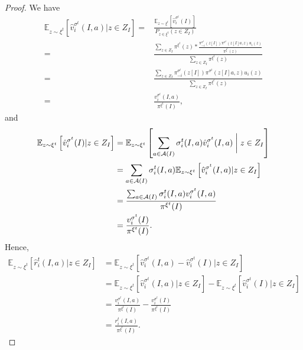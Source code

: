 \documentclass[letterpaper]{article} %
\makeatletter
\renewenvironment{align*}{%
  \linenomath 
  \start@align\@ne\st@rredtrue\m@ne
}{%
  \endalign
  \endlinenomath 
}
\makeatother
\begin{document}
\begin{proof}

We have
\begin{align*}
    \mathbb{E}_{z \sim \xi^t}\left[ \hat{v}_i^{\sigma^t}(I, a) \vert z \in Z_I\right] =& \frac{\mathbb{E}_{z \sim \xi^t}\left[\hat{v}_i^{\sigma^t}(I)\right]}{P_{z \in \xi^t}(z \in Z_I)} \\
    =& \frac{\sum_{z \in Z_I}^{}\pi^{\xi^t}(z) * \frac{\pi_{-i}^{\sigma^t}(z[I])\pi^{\sigma^t}(z[I]a, z)u_i(z)}{\pi^{\xi^t}(z)}}{\sum_{z \in Z_I}^{}\pi^{\xi^t}(z)} \\
    =& \frac{\sum_{z \in Z_I}^{}\pi_{-i}^{\sigma^t}(z[I])\pi^{\sigma^t}(z[I]a, z)u_i(z)}{\sum_{z \in Z_I}^{}\pi^{\xi^t}(z)} \\
    =& \frac{v_i^{\sigma^t}(I, a)}{\pi^{\xi^t}(I)},
\end{align*}
and
\begin{align*}
    \mathbb{E}_{z \sim \xi^t}\left[ \hat{v}_i^{\sigma^t}(I) \vert z \in Z_I\right]  &= \mathbb{E}_{z \sim \xi^t}\left[ \sum_{a \in \mathcal{A}(I)}^{}\sigma^t_i(I, a)\hat{v}_i^{\sigma^t}(I, a) \biggm| z \in Z_I\right] \\
    &= \sum_{a \in \mathcal{A}(I)}^{}\sigma_i^t(I, a)\mathbb{E}_{z \sim \xi^t}\left[ \hat{v}_i^{\sigma^t}(I, a) \vert z \in Z_I\right] \\
    &= \frac{\sum_{a \in \mathcal{A}(I)}^{}\sigma_i^t(I, a)v_i^{\sigma^t}(I, a)}{\pi^{\xi^t}(I)} \\
    &= \frac{v_i^{\sigma^t}(I)}{\pi^{\xi^t}(I)}.
\end{align*}
Hence,
\begin{align*}
    \mathbb{E}_{z \sim \xi^t}\left[ \hat{r}_i^{t}(I, a) \vert z \in Z_I\right] &= \mathbb{E}_{z \sim \xi^t}\left[ \hat{v}_i^{\sigma^t}(I, a) - \hat{v}_i^{\sigma^t}(I)\vert z \in Z_I\right] \\
    &= \mathbb{E}_{z \sim \xi^t}\left[ \hat{v}_i^{\sigma^t}(I, a) \vert z \in Z_I\right] - \mathbb{E}_{z \sim \xi^t}\left[ \hat{v}_i^{\sigma^t}(I) \vert z \in Z_I\right] \\
    &= \frac{v_i^{\sigma^t}(I, a)}{\pi^{\xi^t}(I)} - \frac{v_i^{\sigma^t}(I)}{\pi^{\xi^t}(I)} \\
    &= \frac{r_i^t(I, a)}{\pi^{\xi^t}(I)}.
\end{align*}
\end{proof}
\end{document}

